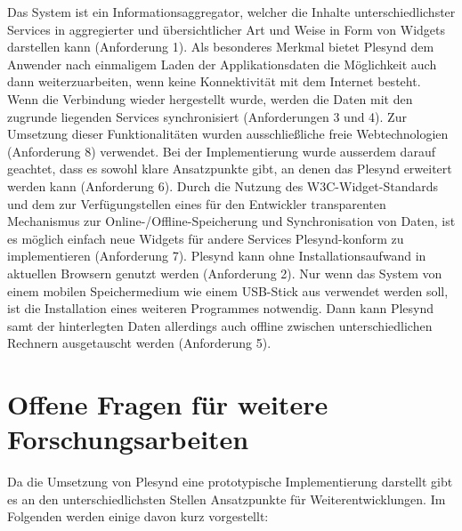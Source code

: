 Das System ist ein Informationsaggregator, welcher die Inhalte unterschiedlichster Services in aggregierter und übersichtlicher Art und Weise in Form von Widgets darstellen kann (Anforderung 1). Als besonderes Merkmal bietet Plesynd dem Anwender nach einmaligem Laden der Applikationsdaten die Möglichkeit auch dann weiterzuarbeiten, wenn keine Konnektivität mit dem Internet besteht. Wenn die Verbindung wieder hergestellt wurde, werden die Daten mit den zugrunde liegenden Services synchronisiert (Anforderungen 3 und 4). Zur Umsetzung dieser Funktionalitäten wurden ausschließliche freie Webtechnologien (Anforderung 8) verwendet. Bei der Implementierung wurde ausserdem darauf geachtet, dass es sowohl klare Ansatzpunkte gibt, an denen das Plesynd erweitert werden kann (Anforderung 6). Durch die Nutzung des W3C-Widget-Standards und dem zur Verfügungstellen eines für den Entwickler transparenten Mechanismus zur Online-/Offline-Speicherung und Synchronisation von Daten, ist es möglich einfach neue Widgets für andere Services Plesynd-konform zu implementieren (Anforderung 7). Plesynd kann ohne Installationsaufwand in aktuellen Browsern genutzt werden (Anforderung 2). Nur wenn das System von einem mobilen Speichermedium wie einem USB-Stick aus verwendet werden soll, ist die Installation eines weiteren Programmes notwendig. Dann kann Plesynd samt der hinterlegten Daten allerdings auch offline zwischen unterschiedlichen Rechnern ausgetauscht werden (Anforderung 5).  

\section{Offene Fragen für weitere Forschungsarbeiten}
Da die Umsetzung von Plesynd eine prototypische Implementierung darstellt gibt es an den unterschiedlichsten Stellen Ansatzpunkte für Weiterentwicklungen. Im Folgenden werden einige davon kurz vorgestellt:


